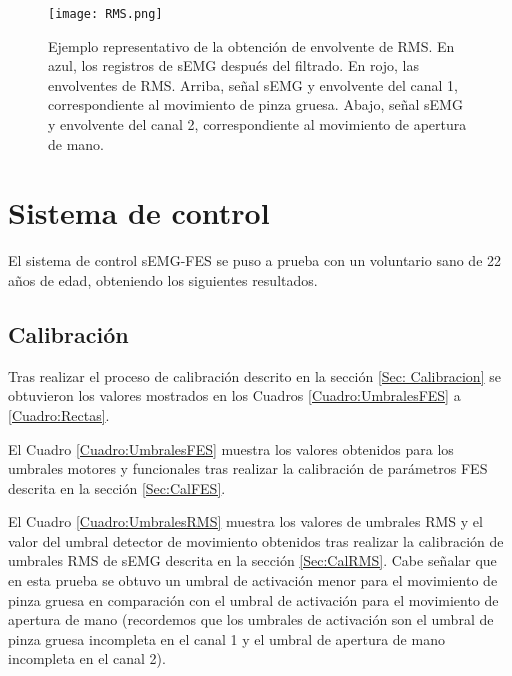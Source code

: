 
\begin{figure}[htbp]
	\centering
	\texttt{[image: RMS.png]}
	\caption[Ejemplo representativo de la obtención de envolvente de RMS]{Ejemplo representativo de la obtención de envolvente de RMS. En azul, los registros de sEMG después del filtrado. En rojo, las envolventes de RMS. Arriba, señal sEMG y envolvente del canal 1, correspondiente al movimiento de pinza gruesa. Abajo, señal sEMG y envolvente del canal 2, correspondiente al movimiento de apertura de mano.}
	\label{Figura: RMS}
\end{figure}


\newpage
\section{Sistema de control}
El sistema de control sEMG-FES se puso a prueba con un voluntario sano de 22 años de edad, obteniendo los siguientes resultados.

\subsection{Calibración}
Tras realizar el proceso de calibración descrito en la sección \ref{Sec: Calibracion} se obtuvieron los valores mostrados en los Cuadros \ref{Cuadro:UmbralesFES} a \ref{Cuadro:Rectas}.

El Cuadro \ref{Cuadro:UmbralesFES} muestra los valores obtenidos para los umbrales motores y funcionales tras realizar la calibración de parámetros FES descrita en la sección \ref{Sec:CalFES}.

El Cuadro \ref{Cuadro:UmbralesRMS} muestra los valores de umbrales RMS y el valor del umbral detector de movimiento obtenidos tras realizar la calibración de umbrales RMS de sEMG descrita en la sección \ref{Sec:CalRMS}. Cabe señalar que en esta prueba se obtuvo un umbral de activación menor para el movimiento de pinza gruesa en comparación con el umbral de activación para el movimiento de apertura de mano (recordemos que los umbrales de activación son el umbral de pinza gruesa incompleta en el canal 1 y el umbral de apertura de mano incompleta en el canal 2).

